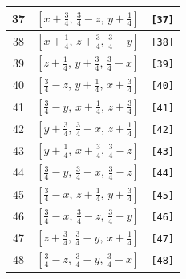 \documentclass[fleqn,8pt]{jsarticle}
\begin{document}
\begin{longtable}{ccc}
37 & $\left[ x + \frac{3}{4},\, \frac{3}{4} - z,\, y + \frac{1}{4} \right]$ & {\tt [37]} \\ \hline
38 & $\left[ x + \frac{1}{4},\, z + \frac{3}{4},\, \frac{3}{4} - y \right]$ & {\tt [38]} \\ \hline
39 & $\left[ z + \frac{1}{4},\, y + \frac{3}{4},\, \frac{3}{4} - x \right]$ & {\tt [39]} \\ \hline
40 & $\left[ \frac{3}{4} - z,\, y + \frac{1}{4},\, x + \frac{3}{4} \right]$ & {\tt [40]} \\ \hline
41 & $\left[ \frac{3}{4} - y,\, x + \frac{1}{4},\, z + \frac{3}{4} \right]$ & {\tt [41]} \\ \hline
42 & $\left[ y + \frac{3}{4},\, \frac{3}{4} - x,\, z + \frac{1}{4} \right]$ & {\tt [42]} \\ \hline
43 & $\left[ y + \frac{1}{4},\, x + \frac{3}{4},\, \frac{3}{4} - z \right]$ & {\tt [43]} \\ \hline
44 & $\left[ \frac{3}{4} - y,\, \frac{3}{4} - x,\, \frac{3}{4} - z \right]$ & {\tt [44]} \\ \hline
45 & $\left[ \frac{3}{4} - x,\, z + \frac{1}{4},\, y + \frac{3}{4} \right]$ & {\tt [45]} \\ \hline
46 & $\left[ \frac{3}{4} - x,\, \frac{3}{4} - z,\, \frac{3}{4} - y \right]$ & {\tt [46]} \\ \hline
47 & $\left[ z + \frac{3}{4},\, \frac{3}{4} - y,\, x + \frac{1}{4} \right]$ & {\tt [47]} \\ \hline
48 & $\left[ \frac{3}{4} - z,\, \frac{3}{4} - y,\, \frac{3}{4} - x \right]$ & {\tt [48]} \\
\end{longtable}
\end{document}
